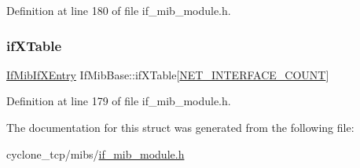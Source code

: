 Definition at line 180 of file if\+\_\+mib\+\_\+module.\+h.

\mbox{\label{structIfMibBase_aa6225a41e399254043fd5a537cb30c81}} 
\subsubsection{\texorpdfstring{if\+X\+Table}{ifXTable}}
{\footnotesize\ttfamily \hyperlink{structIfMibIfXEntry}{If\+Mib\+If\+X\+Entry} If\+Mib\+Base\+::if\+X\+Table\mbox{[}\hyperlink{net__config_8h_a116f850ebcb023ffa3e6b8de10c5cb35}{N\+E\+T\+\_\+\+I\+N\+T\+E\+R\+F\+A\+C\+E\+\_\+\+C\+O\+U\+NT}\mbox{]}}



Definition at line 179 of file if\+\_\+mib\+\_\+module.\+h.



The documentation for this struct was generated from the following file\+:\begin{DoxyCompactItemize}
\item 
cyclone\+\_\+tcp/mibs/\hyperlink{if__mib__module_8h}{if\+\_\+mib\+\_\+module.\+h}\end{DoxyCompactItemize}

